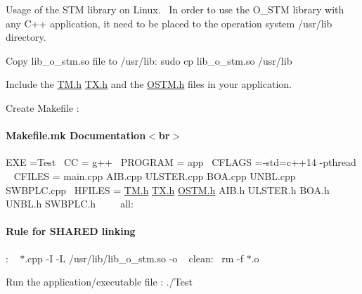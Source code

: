 Usage of the S\+TM library on Linux.~\newline
 In order to use the O\+\_\+\+S\+TM library with any C++ application, it need to be placed to the operation system /usr/lib directory.~\newline

\begin{DoxyEnumerate}
\item Copy lib\+\_\+o\+\_\+stm.\+so file to /usr/lib\+: sudo cp lib\+\_\+o\+\_\+stm.\+so /usr/lib
\item Include the \hyperlink{a00010_source}{T\+M.\+h} \hyperlink{a00012_source}{T\+X.\+h} and the \hyperlink{a00007_source}{O\+S\+T\+M.\+h} files in your application.~\newline

\item Create Makefile \+: ~\newline
~\newline
 \paragraph*{Makefile.\+mk Documentation$<$br$>$~\newline
}
\end{DoxyEnumerate}

E\+XE =Test~\newline
 CC = g++~\newline
 P\+R\+O\+G\+R\+AM = app~\newline
 C\+F\+L\+A\+GS =-\/std=c++14 -\/pthread ~\newline
 C\+F\+I\+L\+ES = main.\+cpp A\+I\+B.\+cpp U\+L\+S\+T\+E\+R.\+cpp B\+O\+A.\+cpp U\+N\+B\+L.\+cpp S\+W\+B\+P\+L\+C.\+cpp~\newline
 H\+F\+I\+L\+ES = \hyperlink{a00010_source}{T\+M.\+h} \hyperlink{a00012_source}{T\+X.\+h} \hyperlink{a00007_source}{O\+S\+T\+M.\+h} A\+I\+B.\+h U\+L\+S\+T\+E\+R.\+h B\+O\+A.\+h U\+N\+B\+L.\+h S\+W\+B\+P\+L\+C.\+h~\newline
 ~\newline
~\newline
 all\+:~\newline
 ~\newline
~\newline
 \paragraph*{Rule for S\+H\+A\+R\+ED linking~\newline
}

\+: ~\newline
   $\ast$.cpp -\/I -\/L /usr/lib/lib\+\_\+o\+\_\+stm.so -\/o  ~\newline
 clean\+:~\newline
 rm -\/f $\ast$.o~\newline
 ~\newline

\begin{DoxyEnumerate}
\item Run the application/executable file \+: ./\+Test 
\end{DoxyEnumerate}
